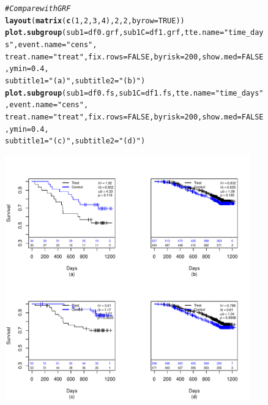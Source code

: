 \documentclass[9pt]{article}\usepackage[]{graphicx}\usepackage[]{xcolor}
\makeatletter
\newcommand{\hlnum}[1]{\textcolor[rgb]{0.686,0.059,0.569}{#1}}%
\newcommand{\hlstr}[1]{\textcolor[rgb]{0.192,0.494,0.8}{#1}}%
\newcommand{\hlcom}[1]{\textcolor[rgb]{0.678,0.584,0.686}{\textit{#1}}}%
\newcommand{\hlstd}[1]{\textcolor[rgb]{0.345,0.345,0.345}{#1}}%
\newcommand{\hlkwc}[1]{\textcolor[rgb]{0.333,0.667,0.333}{#1}}%
\newcommand{\hlkwd}[1]{\textcolor[rgb]{0.737,0.353,0.396}{\textbf{#1}}}%
\newenvironment{kframe}{%
 \def\at@end@of@kframe{}%
 \ifinner\ifhmode%
  \def\at@end@of@kframe{\end{minipage}}%
  \begin{minipage}{\columnwidth}%
 \fi\fi%
 \def\FrameCommand##1{\hskip\@totalleftmargin \hskip-\fboxsep
 \colorbox{shadecolor}{##1}\hskip-\fboxsep
     \hskip-\linewidth \hskip-\@totalleftmargin \hskip\columnwidth}%
 \MakeFramed {\advance\hsize-\width
   \@totalleftmargin\z@ \linewidth\hsize
   \@setminipage}}%
 {\par\unskip\endMakeFramed%
 \at@end@of@kframe}
\newenvironment{knitrout}{}{} %
\theoremstyle{definition}
\theoremstyle{remark}
\makeatother
\begin{document}
\begin{figure}[h!]
\begin{center}
\begin{knitrout}
\color{fgcolor}\begin{kframe}
\begin{alltt}
\hlcom{# Compare with GRF}
\hlkwd{layout}\hlstd{(}\hlkwd{matrix}\hlstd{(}\hlkwd{c}\hlstd{(}\hlnum{1}\hlstd{,} \hlnum{2}\hlstd{,} \hlnum{3}\hlstd{,} \hlnum{4}\hlstd{),} \hlnum{2}\hlstd{,} \hlnum{2}\hlstd{,} \hlkwc{byrow} \hlstd{=} \hlnum{TRUE}\hlstd{))}
\hlkwd{plot.subgroup}\hlstd{(}\hlkwc{sub1} \hlstd{= df0.grf,} \hlkwc{sub1C} \hlstd{= df1.grf,} \hlkwc{tte.name} \hlstd{=} \hlstr{"time_days"}\hlstd{,} \hlkwc{event.name} \hlstd{=} \hlstr{"cens"}\hlstd{,}
    \hlkwc{treat.name} \hlstd{=} \hlstr{"treat"}\hlstd{,} \hlkwc{fix.rows} \hlstd{=} \hlnum{FALSE}\hlstd{,} \hlkwc{byrisk} \hlstd{=} \hlnum{200}\hlstd{,} \hlkwc{show.med} \hlstd{=} \hlnum{FALSE}\hlstd{,} \hlkwc{ymin} \hlstd{=} \hlnum{0.4}\hlstd{,}
    \hlkwc{subtitle1} \hlstd{=} \hlstr{"(a)"}\hlstd{,} \hlkwc{subtitle2} \hlstd{=} \hlstr{"(b)"}\hlstd{)}
\hlkwd{plot.subgroup}\hlstd{(}\hlkwc{sub1} \hlstd{= df0.fs,} \hlkwc{sub1C} \hlstd{= df1.fs,} \hlkwc{tte.name} \hlstd{=} \hlstr{"time_days"}\hlstd{,} \hlkwc{event.name} \hlstd{=} \hlstr{"cens"}\hlstd{,}
    \hlkwc{treat.name} \hlstd{=} \hlstr{"treat"}\hlstd{,} \hlkwc{fix.rows} \hlstd{=} \hlnum{FALSE}\hlstd{,} \hlkwc{byrisk} \hlstd{=} \hlnum{200}\hlstd{,} \hlkwc{show.med} \hlstd{=} \hlnum{FALSE}\hlstd{,} \hlkwc{ymin} \hlstd{=} \hlnum{0.4}\hlstd{,}
    \hlkwc{subtitle1} \hlstd{=} \hlstr{"(c)"}\hlstd{,} \hlkwc{subtitle2} \hlstd{=} \hlstr{"(d)"}\hlstd{)}
\end{alltt}
\end{kframe}
\includegraphics[width=400px,height=400px]{figure/ACTG_2v3_grf-fs_sg-1} 
\end{knitrout}
\end{center}
\end{figure}
\end{document}
